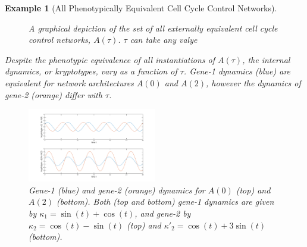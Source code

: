 \documentclass{article}
\newcommand{\1}{\mathbbm{1}}
\newtheorem{example}{Example}
\begin{document}
\begin{example}[All Phenotypically Equivalent Cell Cycle Control Networks]
\begin{figure}[H]
    \caption{A graphical depiction of the set of all externally equivalent cell cycle control networks, $A(\tau)$. $\tau$ can take any valye}
    \end{figure}

   Despite the phenotypic equivalence of all instantiations of $A(\tau)$, the internal dynamics, or kryptotypes, vary as a function of $\tau$. 
    Gene-1 dynamics (blue) are equivalent for network architectures $A(0)$ and $A(2)$, however the dynamics of gene-2 (orange) differ with $\tau$.
  \begin{figure}[H]
    \centering
    \includegraphics[width=0.5\textwidth, height=0.25\paperheight]{osc_A0_A2_both_compare}
    \caption{Gene-1 (blue) and gene-2 (orange) dynamics for $A(0)$ (top) and $A(2)$ (bottom). Both (top and bottom) gene-1 dynamics are given by $ \kappa_{1} = \sin(t) + \cos(t)$, and gene-2 by $\kappa_{2} = \cos(t) - \sin(t)$ (top) and $\kappa'_{2} = \cos(t) + 3 \sin(t)$ (bottom).}
  \end{figure}
  \end{example}
\end{document}

